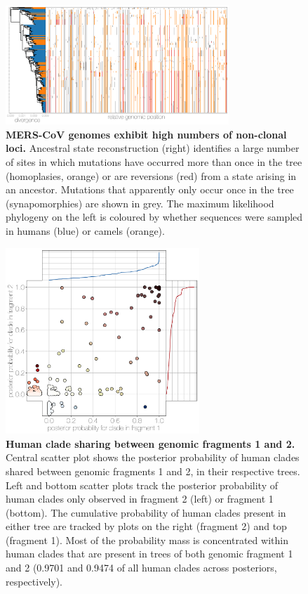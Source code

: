 \documentclass[9pt,lineno]{elife}
\begin{document}
\begin{figure}[h]
\centering
	\includegraphics[width=0.75\textwidth]{figures/mers_incompatibilities.png}
	\caption{\textbf{MERS-CoV genomes exhibit high numbers of non-clonal loci.}
Ancestral state reconstruction (right) identifies a large number of sites in which mutations have occurred more than once in the tree (homoplasies, orange) or are reversions (red) from a state arising in an ancestor.
Mutations that apparently only occur once in the tree (synapomorphies) are shown in grey.
The maximum likelihood phylogeny on the left is coloured by whether sequences were sampled in humans (blue) or camels (orange).
	}
	\label{incompatibilities}
\end{figure}

\begin{figure}[h]
\centering
	\includegraphics[width=0.65\textwidth]{figures/mers_flower.png}
	\caption{\textbf{Human clade sharing between genomic fragments 1 and 2.}
Central scatter plot shows the posterior probability of human clades shared between genomic fragments 1 and 2, in their respective trees.
Left and bottom scatter plots track the posterior probability of human clades only observed in fragment 2 (left) or fragment 1 (bottom).
The cumulative probability of human clades present in either tree are tracked by plots on the right (fragment 2) and top (fragment 1).
Most of the probability mass is concentrated within human clades that are present in trees of both genomic fragment 1 and 2 (0.9701 and 0.9474 of all human clades across posteriors, respectively).
	}
	\label{flower}
\end{figure}
\end{document}
